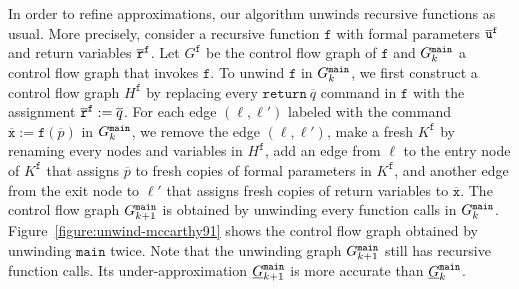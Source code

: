 In order to refine approximations, our algorithm unwinds recursive
functions as usual. More precisely, consider a recursive function
$\mathtt{f}$ with formal parameters $\overline{\mathtt{u}}^{\mathtt{{f}}}$
and return variables $\overline{\mathtt{r}}^{\mathtt{{f}}}$. Let 
$G^{\mathtt{f}}$ be  
the control flow graph of $\mathtt{f}$ and $G^{\mathtt{{main}}}_k$ a
control flow graph 
that invokes $\mathtt{f}$. To unwind $\mathtt{f}$ in $G^{\mathtt{{main}}}_k$, 
we first construct a control flow graph $H^{\mathtt{f}}$ by 
replacing every $\mathtt{return}\ \overline{q}$ command in
$\mathtt{f}$ with the assignment $\mathtt{\overline{r}}^{\mathtt{{f}}} :=
\overline{q}$. For each edge $(\ell,  
\ell')$ labeled with the command $\overline{\mathtt{x}} :=
\mathtt{f}(\overline{p})$ in $G^{\mathtt{{main}}}_k$, we remove 
the edge $(\ell, \ell')$, make a fresh $K^{\mathtt{f}}$ by
renaming every nodes and variables in $H^{\mathtt{f}}$, add an edge
from $\ell$ to the entry node of $K^{\mathtt{f}}$ that assigns
$\overline{p}$ to fresh copies of formal parameters in 
$K^{\mathtt{f}}$, and another edge from the exit node to $\ell'$ that
assigns fresh copies of return variables to
$\overline{\mathtt{x}}$. The control flow graph $G^{\mathtt{{main}}}_{k+1}$ 
is obtained by unwinding every function calls in $G^{\mathtt{{main}}}_k$. 
Figure~\ref{figure:unwind-mccarthy91} shows the control flow graph
obtained by unwinding $\mathtt{main}$ twice. Note that the
unwinding graph $G^{\mathtt{{main}}}_{k+1}$ still has recursive function calls. Its
under-approximation $\underline{G}^{\mathtt{{main}}}_{k+1}$ is more
accurate than $\underline{G}^{\mathtt{{main}}}_k$. 

